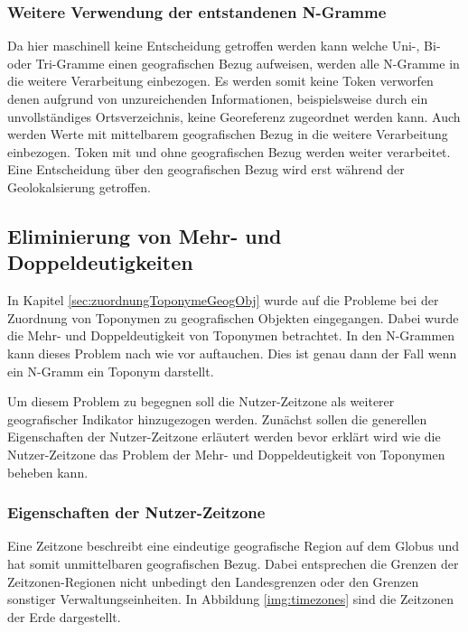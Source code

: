 			\subsubsection{Weitere Verwendung der entstandenen N-Gramme} 

				Da hier maschinell keine Entscheidung getroffen werden kann welche Uni-, Bi- oder Tri-Gramme einen geografischen Bezug aufweisen, werden alle N-Gramme in die weitere Verarbeitung einbezogen. 			
				Es werden somit keine Token verworfen denen aufgrund von unzureichenden Informationen, beispielsweise durch ein unvollständiges Ortsverzeichnis, keine Georeferenz zugeordnet werden kann.
				Auch werden Werte mit mittelbarem geografischen Bezug in die weitere Verarbeitung einbezogen.
				Token mit und ohne geografischen Bezug werden weiter verarbeitet.
				Eine Entscheidung über den geografischen Bezug wird erst während der Geolokalsierung getroffen.

		\subsection{Eliminierung von Mehr- und Doppeldeutigkeiten}

				In Kapitel \ref{sec:zuordnungToponymeGeogObj} wurde auf die Probleme bei der Zuordnung von Toponymen zu geografischen Objekten eingegangen.
				Dabei wurde die Mehr- und Doppeldeutigkeit von Toponymen betrachtet.
				In den N-Grammen kann dieses Problem nach wie vor auftauchen.
				Dies ist genau dann der Fall wenn ein N-Gramm ein Toponym darstellt.

				Um diesem Problem zu begegnen soll die Nutzer-Zeitzone als weiterer geografischer Indikator hinzugezogen werden.
				Zunächst sollen die generellen Eigenschaften der Nutzer-Zeitzone erläutert werden bevor erklärt wird wie die Nutzer-Zeitzone das Problem der Mehr- und Doppeldeutigkeit von Toponymen beheben kann.

				\subsubsection{Eigenschaften der Nutzer-Zeitzone}

					Eine Zeitzone beschreibt eine eindeutige geografische Region auf dem Globus und hat somit unmittelbaren geografischen Bezug.
					Dabei entsprechen die Grenzen der Zeitzonen-Regionen nicht unbedingt den Landesgrenzen oder den Grenzen sonstiger Verwaltungseinheiten. 
					In Abbildung \ref{img:timezones} sind die Zeitzonen der Erde dargestellt.


